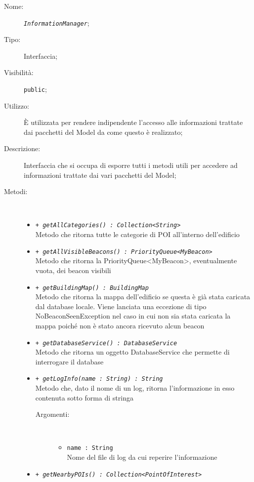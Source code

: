 \documentclass[../DefinizioneDiProdotto.tex]{subfiles}
\begin{document}
    \begin{description}
\item[Nome:] \texttt{\textit{InformationManager}};
\item[Tipo:] Interfaccia;
\item[Visibilità:] \texttt{public};
\item[Utilizzo:] È utilizzata per rendere indipendente l'accesso alle informazioni trattate dai pacchetti del Model da come questo è realizzato;
\item[Descrizione:] Interfaccia che si occupa di esporre tutti i metodi utili per accedere ad informazioni trattate dai vari pacchetti del Model;
\item[Metodi:] \
\begin{itemize}
\item \texttt{+ \textit{getAllCategories() : Collection<String>}}\\
Metodo che ritorna tutte le categorie di POI all'interno dell'edificio
 \item \texttt{+ \textit{getAllVisibleBeacons() : PriorityQueue<MyBeacon>}}\\
Metodo che ritorna la PriorityQueue<MyBeacon>, eventualmente vuota, dei beacon visibili
 \item \texttt{+ \textit{getBuildingMap() : BuildingMap}}\\
Metodo che ritorna la mappa dell'edificio se questa è già stata caricata dal database locale. Viene lanciata una eccezione di tipo NoBeaconSeenException nel caso in cui non sia stata caricata la mappa poiché non è stato ancora ricevuto alcun beacon
 \item \texttt{+ \textit{getDatabaseService() : DatabaseService}}\\
Metodo che ritorna un oggetto DatabaseService che permette di interrogare il database
 \item \texttt{+ \textit{getLogInfo(name : String) : String}}\\
Metodo che, dato il nome di un log, ritorna l'informazione in esso contenuta sotto forma di stringa
 \begin{description}
\item[Argomenti:] \
\begin{itemize}
\item \texttt{name : String}\\
Nome del file di log da cui reperire l'informazione\end{itemize}
\end{description}
\item \texttt{+ \textit{getNearbyPOIs() : Collection<PointOfInterest>}}\\

\end{itemize}
\end{description}
\end{document}
